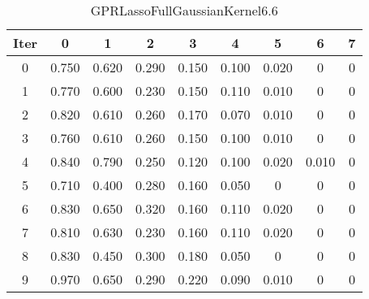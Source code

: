 \begin{table}
	\begin{center}
		\begin{tabular}{|c|c|c|c|c|c|c|c|c|}
			\hline
			Iter & 0 & 1 & 2 & 3 & 4 & 5 & 6 & 7 \\
			\hline
			0 & 0.750 & 0.620 & 0.290 & 0.150 & 0.100 & 0.020 & 0 & 0 \\
			\hline
			1 & 0.770 & 0.600 & 0.230 & 0.150 & 0.110 & 0.010 & 0 & 0 \\
			\hline
			2 & 0.820 & 0.610 & 0.260 & 0.170 & 0.070 & 0.010 & 0 & 0 \\
			\hline
			3 & 0.760 & 0.610 & 0.260 & 0.150 & 0.100 & 0.010 & 0 & 0 \\
			\hline
			4 & 0.840 & 0.790 & 0.250 & 0.120 & 0.100 & 0.020 & 0.010 & 0 \\
			\hline
			5 & 0.710 & 0.400 & 0.280 & 0.160 & 0.050 & 0 & 0 & 0 \\
			\hline
			6 & 0.830 & 0.650 & 0.320 & 0.160 & 0.110 & 0.020 & 0 & 0 \\
			\hline
			7 & 0.810 & 0.630 & 0.230 & 0.160 & 0.110 & 0.020 & 0 & 0 \\
			\hline
			8 & 0.830 & 0.450 & 0.300 & 0.180 & 0.050 & 0 & 0 & 0 \\
			\hline
			9 & 0.970 & 0.650 & 0.290 & 0.220 & 0.090 & 0.010 & 0 & 0 \\
			\hline
		\end{tabular}
	\end{center}
	\caption{GPRLassoFullGaussianKernel6.6}
\end{table}